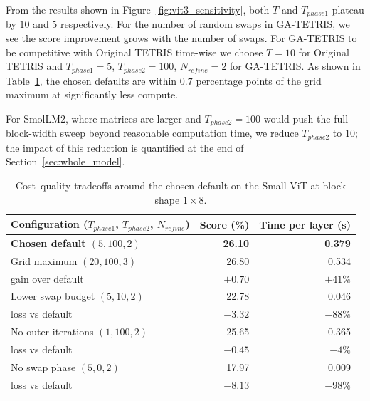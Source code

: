 From the results shown in Figure~\ref{fig:vit3_sensitivity}, both $T$ and $T_{phase1}$ plateau by $10$ and $5$ respectively. For the number of random swaps in GA-TETRIS, we see the score improvement grows with the number of swaps. For GA-TETRIS to be competitive with Original TETRIS time-wise we choose $T = 10$ for Original TETRIS and $T_{phase1} = 5$, $T_{phase2} = 100$, $N_{refine} = 2$ for GA-TETRIS. As shown in Table~\ref{tab:default_justification}, the chosen defaults are within $0.7$ percentage points of the grid maximum at significantly less compute.

For SmolLM2, where matrices are larger and $T_{phase2} = 100$ would push the full block-width sweep beyond reasonable computation time, we reduce $T_{phase2}$ to $10$; the impact of this reduction is quantified at the end of Section~\ref{sec:whole_model}.

\begin{table}[H]
    \centering
    \caption{Cost--quality tradeoffs around the chosen default on the Small ViT at block shape $1 \times 8$.}
    \label{tab:default_justification}
    \medskip
    \begin{tabular}{l r r}
        \toprule
        Configuration ($T_{phase1}$, $T_{phase2}$, $N_{refine}$) & Score (\%) & Time per layer (s) \\
        \midrule
        \textbf{Chosen default $(5, 100, 2)$}     & \textbf{26.10} & \textbf{0.379} \\
        \midrule
        Grid maximum $(20, 100, 3)$              & 26.80 & 0.534 \\
        \quad gain over default                  & $+0.70$ & $+41\%$ \\
        \addlinespace
        Lower swap budget $(5, 10, 2)$           & 22.78 & 0.046 \\
        \quad loss vs default                    & $-3.32$ & $-88\%$ \\
        \addlinespace
        No outer iterations $(1, 100, 2)$        & 25.65 & 0.365 \\
        \quad loss vs default                    & $-0.45$ & $-4\%$ \\
        \addlinespace
        No swap phase $(5, 0, 2)$                & 17.97 & 0.009 \\
        \quad loss vs default                    & $-8.13$ & $-98\%$ \\
        \bottomrule
    \end{tabular}
\end{table}

